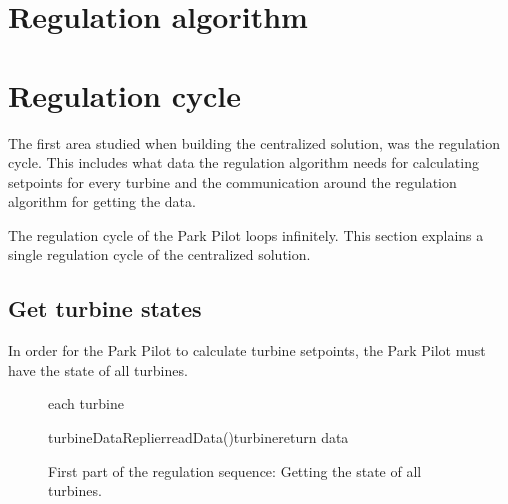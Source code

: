 


\section{Regulation algorithm}\label{sec:regAlgorithm}



\section{Regulation cycle}\label{sec:currentSystemCen} 

The first area studied when building the centralized solution, was the regulation cycle. This includes what data the regulation algorithm needs for calculating setpoints for every turbine and the communication around the regulation algorithm for getting the data.

The regulation cycle of the Park Pilot loops infinitely. This section explains a single regulation cycle of the centralized solution.

\subsection{Get turbine states}\label{sec:getTurbineStates}

In order for the Park Pilot to calculate turbine setpoints, the Park Pilot must have the state of all turbines.

\begin{figure}
	\centering
	\begin{sequencediagram} %
	
		\begin{sdblock}{each turbine}{}
			\begin {call}{turbineDataReplier}{readData()}{turbine}{return data}
			\end {call}
		\end{sdblock}				
	\end{sequencediagram}

	\caption[Regulator calculation sequence]{
		\label{fig:getStatesOfTurbines} 
		\footnotesize{%
			First part of the regulation sequence: Getting the state of all turbines.
		}
	}
\end{figure}


